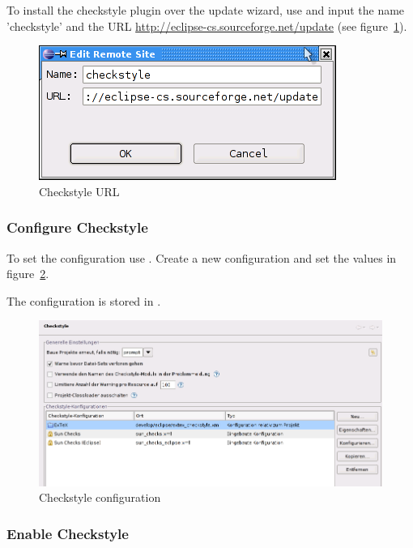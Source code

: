 To install the checkstyle plugin over the update wizard, use
 and input the name
'checkstyle' and the URL \url{http://eclipse-cs.sourceforge.net/update}
(see figure~\ref{fig:eclipse-checkstyle-url}).
\begin{figure}[htp]
  \centering  \includegraphics[scale=.5]{image/eclipse-checkstyle-url}
  \caption{Checkstyle URL}\label{fig:eclipse-checkstyle-url}
\end{figure}

\subsubsection*{Configure Checkstyle}

To set the configuration use .
Create a new configuration and set the values in
figure~\ref{fig:eclipse-checkstyle-config}.

The configuration is stored in .

\begin{figure}[htp]
  \centering  \includegraphics[scale=.5]{image/eclipse-checkstyle-config}
  \caption{Checkstyle configuration}\label{fig:eclipse-checkstyle-config}
\end{figure}

\subsubsection*{Enable Checkstyle}

